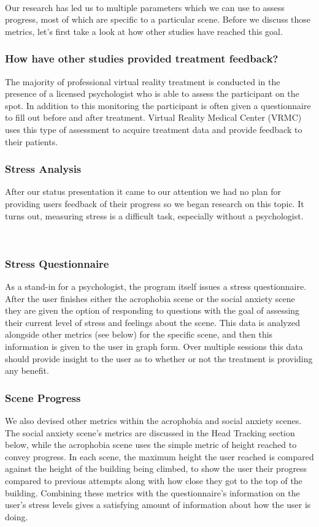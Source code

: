 \documentclass[a4paper,10pt]{article}
\begin{document}
\par~\\ 
Our research has led us to multiple parameters which we can use to assess progress, most of which are specific to a particular scene. Before we discuss those metrics, 
let's first take a look at how other studies have reached this goal.

\subsubsection{How have other studies provided treatment feedback?}
The majority of professional virtual reality treatment is conducted in the presence of a licensed psychologist who is able to assess the participant on the spot. In addition 
to this monitoring the participant is often given a questionnaire to fill out before and after treatment. Virtual Reality Medical Center (VRMC) uses this type of assessment to 
acquire treatment data and provide feedback to their patients. \cite{vrPhobia}

\subsubsection{Stress Analysis}
After our status presentation it came to our attention we had no plan for providing users feedback of their progress so we began research on this topic. It turns out, measuring stress is a difficult task, especially without a psychologist.
\par~\\

\subsubsection{Stress Questionnaire}
As a stand-in for a psychologist, the program itself issues a stress questionnaire. After the user finishes either the acrophobia scene or the social anxiety scene they are given the option of responding to questions with the goal of assessing their current level of stress and feelings about the scene. This data is analyzed alongside other metrics (see below) for the specific scene, and then this information is given to the user in graph form. Over multiple sessions this data should provide insight to the user as to whether or not the treatment is providing any benefit.

\subsubsection{Scene Progress}
We also devised other metrics within the acrophobia and social anxiety scenes.  The social anxiety scene's metrics are discussed in the Head Tracking section below, while the acrophobia scene uses the simple metric of height reached to convey progress.  In each scene, the maximum height the user reached is compared against the height of the building being climbed, to show the user their progress compared to previous attempts along with how close they got to the top of the building.  Combining these metrics with the questionnaire's information on the user's stress levels gives a satisfying amount of information about how the user is doing.
\end{document}
